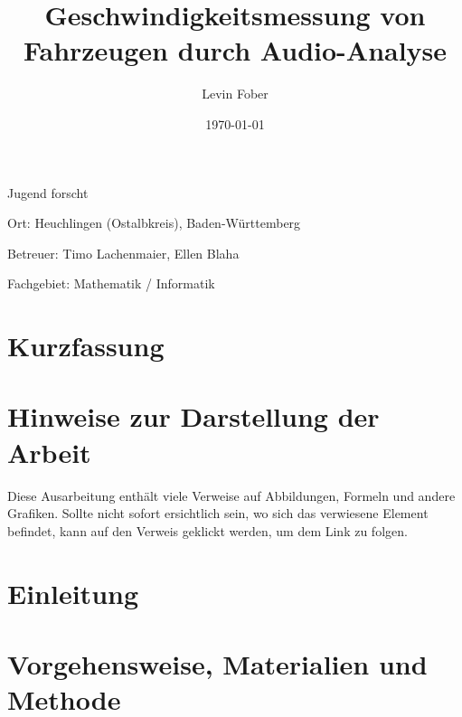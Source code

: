 \documentclass[12pt, a4paper]{article}
\title{\textbf{Geschwindigkeitsmessung von Fahrzeugen durch Audio-Analyse}}
\author{Levin Fober}
\date{\today}
\begin{document}

\maketitle

\begin{center}
    Jugend forscht

    Ort: Heuchlingen (Ostalbkreis), Baden-Württemberg

    Betreuer: Timo Lachenmaier, Ellen Blaha

    Fachgebiet: Mathematik / Informatik
\end{center}

\newpage

\thispagestyle{plain}

\section*{Kurzfassung}

\newpage

\thispagestyle{plain}

\tableofcontents

\newpage

\section*{Hinweise zur Darstellung der Arbeit}

Diese Ausarbeitung enthält viele Verweise auf Abbildungen, Formeln und andere Grafiken. Sollte nicht sofort ersichtlich sein, wo sich das verwiesene Element befindet, kann auf den Verweis geklickt werden, um dem Link zu folgen.

\listoftodos

\thispagestyle{plain}

\cleardoublepage%

\section{Einleitung}


\section{Vorgehensweise, Materialien und Methode}

\end{document}
